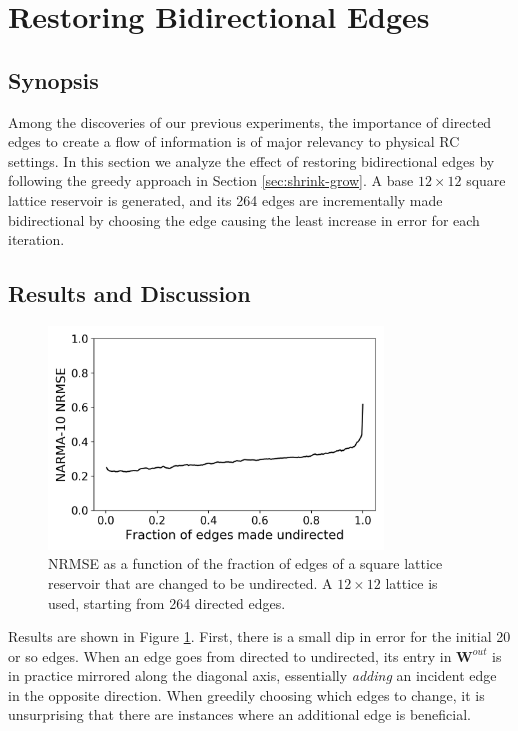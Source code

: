 \section{Restoring Bidirectional Edges}

\subsection{Synopsis}

Among the discoveries of our previous experiments, the importance of directed
edges to create a flow of information is of major relevancy to physical RC
settings. In this section we analyze the effect of restoring bidirectional edges
by following the greedy approach in Section \ref{sec:shrink-grow}. A base $12
\times 12$ square lattice reservoir is generated, and its 264 edges are
incrementally made bidirectional by choosing the edge causing the least increase
in error for each iteration.

\subsection{Results and Discussion}

\begin{figure}
  \centering
  \includegraphics[width=3.5in]{figures/undir-performance.png}
  \caption{
    NRMSE as a function of the fraction of edges of a square lattice reservoir
that are changed to be undirected. A $12 \times 12$ lattice is used, starting
from 264 directed edges.
  }
  \label{fig:undirection-performance}
\end{figure}

Results are shown in Figure \ref{fig:undirection-performance}. First, there is a
small dip in error for the initial 20 or so edges. When an edge goes from
directed to undirected, its entry in $\mathbf{W}^{out}$ is in practice mirrored
along the diagonal axis, essentially \textit{adding} an incident edge in the
opposite direction. When greedily choosing which edges to change, it is
unsurprising that there are instances where an additional edge is beneficial.

